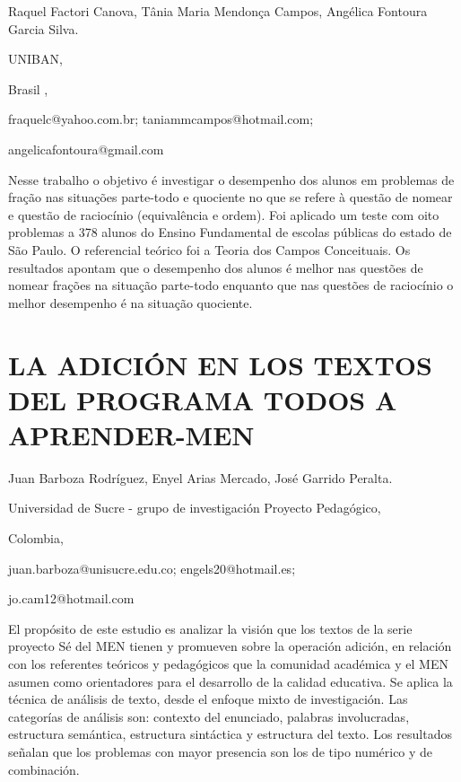 \begin{datos}

Raquel Factori Canova, Tânia Maria Mendonça Campos, Angélica Fontoura
Garcia Silva.

UNIBAN,

Brasil ,

fraquelc@yahoo.com.br; taniammcampos@hotmail.com;

angelicafontoura@gmail.com

\end{datos}

Nesse trabalho o objetivo é investigar o desempenho dos alunos em
problemas de fração nas situações parte-todo e quociente no que se
refere à questão de nomear e questão de raciocínio (equivalência e
ordem). Foi aplicado um teste com oito problemas a 378 alunos do Ensino
Fundamental de escolas públicas do estado de São Paulo. O referencial
teórico foi a Teoria dos Campos Conceituais. Os resultados apontam
que o desempenho dos alunos é melhor nas questões de nomear frações
na situação parte-todo enquanto que nas questões de raciocínio o melhor
desempenho é na situação quociente.


\section{LA ADICIÓN EN LOS TEXTOS DEL PROGRAMA TODOS A APRENDER-MEN}

\begin{datos}

Juan Barboza Rodríguez, Enyel Arias Mercado, José Garrido Peralta.

Universidad de Sucre - grupo de investigación Proyecto Pedagógico,

Colombia,

juan.barboza@unisucre.edu.co; engels20@hotmail.es;

jo.cam12@hotmail.com

\end{datos}

El propósito de este estudio es analizar la visión que los textos
de la serie proyecto Sé del MEN tienen y promueven sobre la operación
adición, en relación con los referentes teóricos y pedagógicos que
la comunidad académica y el MEN asumen como orientadores para el desarrollo
de la calidad educativa. Se aplica la técnica de análisis de texto,
desde el enfoque mixto de investigación. Las categorías de análisis
son: contexto del enunciado, palabras involucradas, estructura semántica,
estructura sintáctica y estructura del texto. Los resultados señalan
que los problemas con mayor presencia son los de tipo numérico y de
combinación. 


